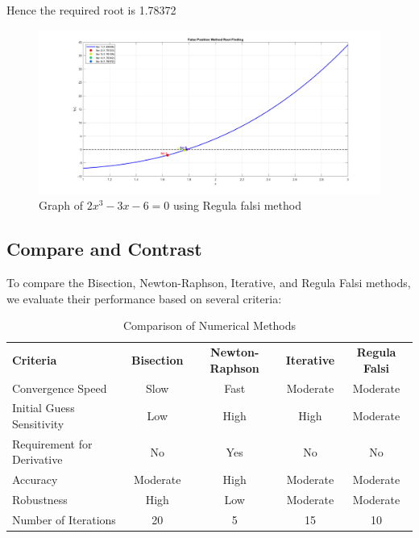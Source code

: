 \documentclass[12pt,a4paper]{article}
\begin{document}
	Hence the required root is 1.78372
	
		\begin{figure}[h]
		
		\includegraphics[width=01\textwidth, ]{four_by_one_false.png} %
		\caption{Graph of $2x^3 - 3x -6 = 0$ using Regula falsi method}
		\label{fig:your_label_here}
	\end{figure}

		\subsection{Compare and Contrast}
		
		To compare the Bisection, Newton-Raphson, Iterative, and Regula Falsi methods, we evaluate their performance based on several criteria:
		
		\begin{table}[h]
			\centering
			\begin{tabular}{lcccc}
				
				\textbf{Criteria} & \textbf{Bisection} & \textbf{Newton-Raphson} & \textbf{Iterative} & \textbf{Regula Falsi} \\
				
				Convergence Speed & Slow & Fast & Moderate & Moderate \\
				Initial Guess Sensitivity & Low & High & High & Moderate \\
				Requirement for Derivative & No & Yes & No & No \\
				Accuracy & Moderate & High & Moderate & Moderate \\
				Robustness & High & Low & Moderate & Moderate \\
				Number of Iterations & 20 & 5 & 15 & 10 \\
				
			\end{tabular}
			\caption{Comparison of Numerical Methods}
			\label{tab:comparison}
		\end{table}
		
\end{document}
